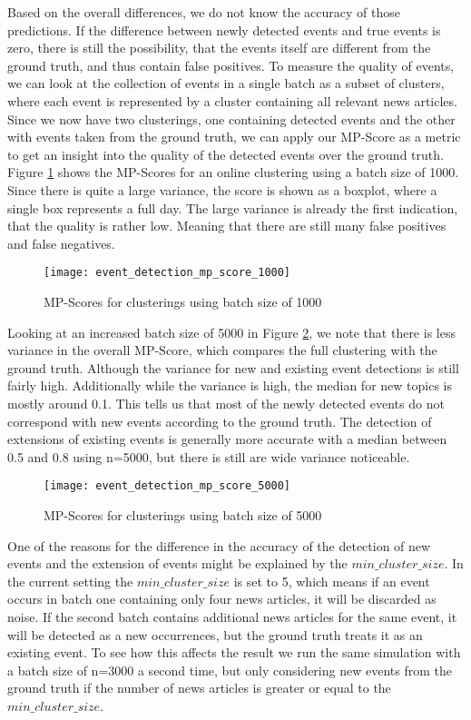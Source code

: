 Based on the overall differences, we do not know the accuracy of those predictions. 
If the difference between newly detected events and true events is zero, there is still the possibility, that the events itself are different from the ground truth, and thus contain false positives. To measure the quality of events, we can look at the collection of events in a single batch as a subset of clusters, where each event is represented by a cluster containing all relevant news articles. Since we now have two clusterings, one containing detected events and the other with events taken from the ground truth, we can apply our MP-Score as a metric to get an insight into the quality of the detected events over the ground truth. Figure \ref{fig:event_detection_mp_score_1000} shows the MP-Scores for an online clustering using a batch size of 1000. Since there is quite a large variance, the score is shown as a boxplot, where a single box represents a full day. The large variance is already the first indication, that the quality is rather low. Meaning that there are still many false positives and false negatives.

\begin{figure}[h]
    \centering
    \texttt{[image: event\_detection\_mp\_score\_1000]}
    \caption{MP-Scores for clusterings using batch size of 1000}
    \label{fig:event_detection_mp_score_1000}
\end{figure}

Looking at an increased batch size of 5000 in Figure \ref{fig:event_detection_mp_score_5000}, we note that there is less variance in the overall MP-Score, which compares the full clustering with the ground truth. Although the variance for new and existing event detections is still fairly high. Additionally while the variance is high, the median for new topics is mostly around 0.1. This tells us that most of the newly detected events do not correspond with new events according to the ground truth. The detection of extensions of existing events is generally more accurate with a median between 0.5 and 0.8 using n=5000, but there is still are wide variance noticeable.

\begin{figure}[h]
    \centering
    \texttt{[image: event\_detection\_mp\_score\_5000]}
    \caption{MP-Scores for clusterings using batch size of 5000}
    \label{fig:event_detection_mp_score_5000}
\end{figure}

One of the reasons for the difference in the accuracy of the detection of new events and the extension of events might be explained by the $min\_cluster\_size$. In the current setting the $min\_cluster\_size$ is set to 5, which means if an event occurs in batch one containing only four news articles, it will be discarded as noise. If the second batch contains additional news articles for the same event, it will be detected as a new occurrences, but the ground truth treats it as an existing event. To see how this affects the result we run the same simulation with a batch size of n=3000 a second time, but only considering new events from the ground truth if the number of news articles is greater or equal to the $min\_cluster\_size$.

